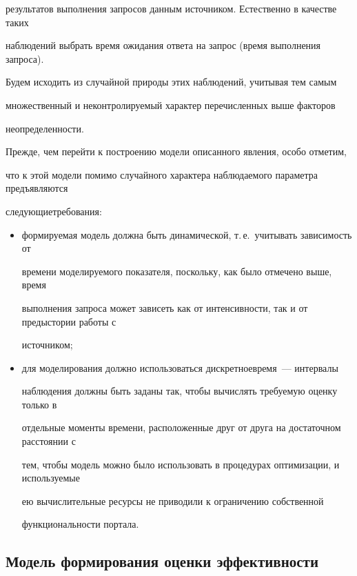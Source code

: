 результатов выполнения запросов данным источником. Естественно в качестве таких 


наблюдений выбрать время ожидания ответа на запрос (время выполнения запроса). 


Будем исходить из случайной природы этих наблюдений, учитывая тем самым 


множественный и неконтролируемый характер пере\-чис\-лен\-ных выше факторов 


неопределенности.


      


      Прежде, чем перейти к построению модели описанного явления, особо отметим, 


что к этой модели помимо случайного характера наблюдаемого параметра предъявляются 


следующие\linebreak требования:


      \begin{itemize}


\item формируемая модель должна быть динамической, т.\,е.\ учитывать зависимость от 


времени моделируемого по\-ка\-за\-те\-ля, поскольку, как было отмечено выше, время 


выполнения запроса может зависеть как от интенсивности, так и от предыстории работы с 


источником;


\item для моделирования должно использоваться дискретное\linebreak время~--- интервалы 


наблюдения должны быть заданы так, чтобы вычислять требуемую оценку только в 


отдельные моменты времени, расположенные друг от друга на достаточном расстоянии с 


тем, чтобы модель можно было использовать в процедурах оптимизации, и используемые 


ею вычислительные ресурсы не приводили к ограничению собственной 


функциональности портала.


      \end{itemize}


      


\subsection{Модель формирования оценки эффективности} %


